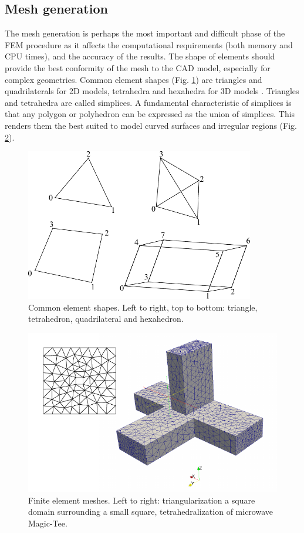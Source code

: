 \subsection{Mesh generation}

The mesh generation is perhaps the most important and difficult phase of the FEM procedure as it affects the computational requirements (both memory and CPU times), and the accuracy of the results. The shape of elements should provide the best conformity of the mesh to the CAD model, especially for complex geometries. Common element shapes (Fig. \ref{fig:Elements}) are triangles and quadrilaterals for 2D models, tetrahedra and hexahedra for 3D models \cite{cubit}. Triangles and tetrahedra are called simplices. A fundamental characteristic of simplices is that any polygon or polyhedron can be expressed as the union of simplices. This renders them the best suited to model curved surfaces and irregular regions (Fig. \ref{fig:Mesh}).

\begin{figure}[h!]
\centering
\includegraphics[width=10cm]{Elements}
\caption{Common element shapes. Left to right, top to bottom: triangle, tetrahedron, quadrilateral and hexahedron.}
\label{fig:Elements}
\end{figure}

\begin{figure}[h!]
\centering
\includegraphics[width=12cm]{Mesh}
\caption{Finite element meshes. Left to right: triangularization a square domain surrounding a small square, tetrahedralization of microwave Magic-Tee.}
\label{fig:Mesh}
\end{figure}

